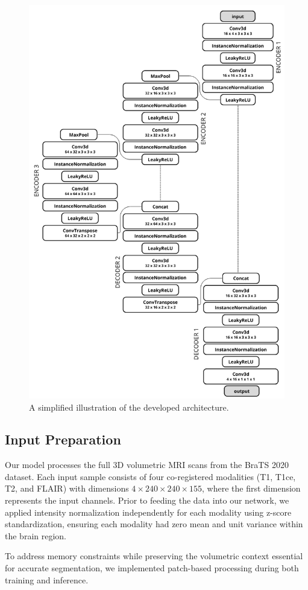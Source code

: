 \documentclass[10pt,twocolumn,letterpaper]{article}
\begin{document}
\begin{figure}
    \centering
    \includegraphics[width=0.8\linewidth]{img/architect.png}
    \caption{A simplified illustration of the developed architecture.}
\end{figure}

\subsection{Input Preparation}
Our model processes the full 3D volumetric MRI scans from the BraTS 2020 dataset. Each input sample consists of four co-registered modalities (T1, T1ce, T2, and FLAIR) with dimensions $4 \times 240 \times 240 \times 155$, where the first dimension represents the input channels. Prior to feeding the data into our network, we applied intensity normalization independently for each modality using z-score standardization, ensuring each modality had zero mean and unit variance within the brain region.

To address memory constraints while preserving the volumetric context essential for accurate segmentation, 
we implemented patch-based processing during both training and inference. 
\end{document}
